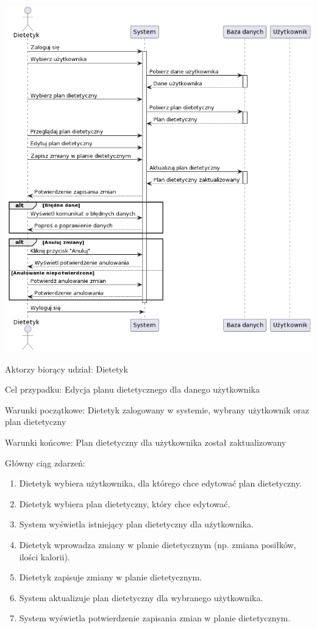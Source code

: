{\includegraphics{diagrams/sequence/dietetyk_edytuj_plan}}

{Aktorzy biorący udział: Dietetyk}

{Cel przypadku: Edycja planu dietetycznego dla danego użytkownika}

{Warunki początkowe: Dietetyk zalogowany w systemie, wybrany użytkownik
oraz plan dietetyczny}

{Warunki końcowe: Plan dietetyczny dla użytkownika został
zaktualizowany}

{Główny ciąg zdarzeń:}

\begin{enumerate}
\tightlist
\item
  {Dietetyk wybiera użytkownika, dla którego chce edytować plan
  dietetyczny.}
\item
  {Dietetyk wybiera plan dietetyczny, który chce edytować.}
\item
  {System wyświetla istniejący plan dietetyczny dla użytkownika.}
\item
  {Dietetyk wprowadza zmiany w planie dietetycznym (np. zmiana posiłków,
  ilości kalorii).}
\item
  {Dietetyk zapisuje zmiany w planie dietetycznym.}
\item
  {System aktualizuje plan dietetyczny dla wybranego użytkownika.}
\item
  {System wyświetla potwierdzenie zapisania zmian w planie
  dietetycznym.}
\end{enumerate}

